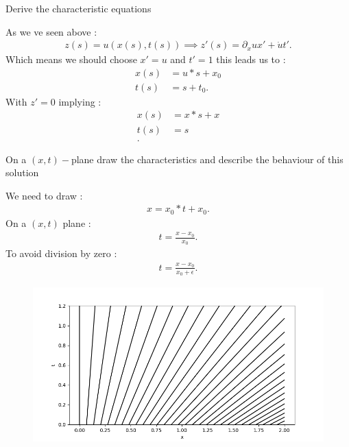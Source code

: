 \begin{question}
	Derive the characteristic equations
\end{question}
\begin{solution}
	As we ve seen above :
	\begin{align*}
		z(s) = u(x(s),t(s)) \implies  z'(s) = \partial_x u x' + \dot{u} t'
		.\end{align*}
	Which means we should choose $x' = u$ and $t' = 1 $ this leads us to :
	\begin{align*}
		x(s) & = u*s + x_{0} \\
		t(s) & = s+t_{0}
		.\end{align*}
	With $z' = 0$ implying :
	\begin{align*}
		x(s) & = x*s+x \\
		t(s) & = s     \\
		.\end{align*}
\end{solution}
\begin{question}
	On a $(x,t)-$plane draw the characteristics and describe the behaviour of this solution
\end{question}
\begin{solution}
	We need to draw :
	\begin{align*}
		x = x_{0}*t + x_{0}
		.\end{align*}
    On a $(x,t)$ plane : 
    \begin{align*}
      t = \frac{x-x_{0}}{x_{0}}
    .\end{align*}
    To avoid division by zero :
    \begin{align*}
      t = \frac{x-x_{0}}{x_{0}+\epsilon }
    .\end{align*}
    \begin{figure}[H]
     \centering 
     \includegraphics[scale=0.5]{figures/sheet_3_burger.png} 
   \end{figure}
\end{solution}
